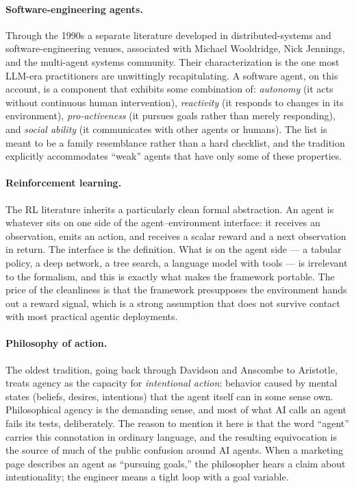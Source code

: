 \paragraph{Software-engineering agents.}
Through the 1990s a separate literature developed in
distributed-systems and software-engineering venues, associated
with Michael Wooldridge, Nick Jennings, and the multi-agent
systems community. Their characterization is the one most
LLM-era practitioners are unwittingly recapitulating. A software
agent, on this account, is a component that exhibits some
combination of: \emph{autonomy} (it acts without continuous human
intervention), \emph{reactivity} (it responds to changes in its
environment), \emph{pro-activeness} (it pursues goals rather than
merely responding), and \emph{social ability} (it communicates
with other agents or humans). The list is meant to be a family
resemblance rather than a hard checklist, and the tradition
explicitly accommodates ``weak'' agents that have only some of
these properties.

\paragraph{Reinforcement learning.}
The RL literature inherits a particularly clean formal
abstraction. An agent is whatever sits on one side of the
agent--environment interface: it receives an observation, emits an
action, and receives a scalar reward and a next observation in
return. The interface is the definition. What is on the agent
side --- a tabular policy, a deep network, a tree search, a
language model with tools --- is irrelevant to the formalism, and
this is exactly what makes the framework portable. The price of
the cleanliness is that the framework presupposes the environment
hands out a reward signal, which is a strong assumption that does
not survive contact with most practical agentic deployments.

\paragraph{Philosophy of action.}
The oldest tradition, going back through Davidson and Anscombe to
Aristotle, treats agency as the capacity for \emph{intentional
action}: behavior caused by mental states (beliefs, desires,
intentions) that the agent itself can in some sense own.
Philosophical agency is the demanding sense, and most of what AI
calls an agent fails its tests, deliberately. The reason to
mention it here is that the word ``agent'' carries this
connotation in ordinary language, and the resulting equivocation
is the source of much of the public confusion around AI agents.
When a marketing page describes an agent as ``pursuing goals,''
the philosopher hears a claim about intentionality; the engineer
means a tight loop with a goal variable.

